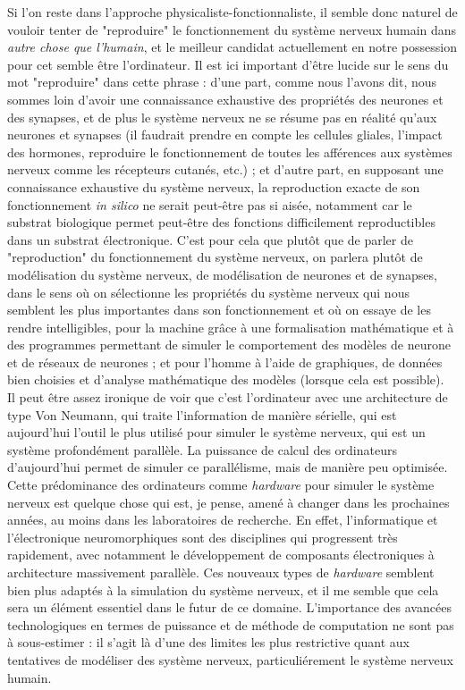 \documentclass[12pt]{scrartcl}
\begin{document}
Si l'on reste dans l'approche physicaliste-fonctionnaliste, il semble donc naturel de vouloir tenter de "reproduire" le fonctionnement du système nerveux humain dans \textit{autre chose que l'humain}, et le meilleur candidat actuellement en notre possession pour cet  semble être l'ordinateur. Il est ici important d'être lucide sur le sens du mot "reproduire" dans cette phrase : d'une part, comme nous l'avons dit, nous sommes loin d'avoir une connaissance exhaustive des propriétés des neurones et des synapses, et de plus le système nerveux ne se résume pas en réalité qu'aux neurones et synapses (il faudrait prendre en compte les cellules gliales, l'impact des hormones, reproduire le fonctionnement de toutes les afférences aux systèmes nerveux comme les récepteurs cutanés, etc.) ; et d'autre part, en supposant une connaissance exhaustive du système nerveux, la reproduction exacte de son fonctionnement \textit{in silico} ne serait peut-être pas si aisée, notamment car le substrat biologique permet peut-être des fonctions difficilement reproductibles dans un substrat électronique. C'est pour cela que plutôt que de parler de "reproduction" du fonctionnement du système nerveux, on parlera plutôt de modélisation du système nerveux, de modélisation de neurones et de synapses, dans le sens où on sélectionne les propriétés du système nerveux qui nous semblent les plus importantes dans son fonctionnement et où on essaye de les rendre intelligibles, pour la machine grâce à une formalisation mathématique et à des programmes permettant de simuler le comportement des modèles de neurone et de réseaux de neurones ; et pour l'homme à l'aide de graphiques, de données bien choisies et d'analyse mathématique des modèles (lorsque cela est possible).\\

Il peut être assez ironique de voir que c'est l'ordinateur avec une architecture de type Von Neumann, qui traite l'information de manière sérielle, qui est aujourd'hui l'outil le plus utilisé pour simuler le système nerveux, qui est un système profondément parallèle. La puissance de calcul des ordinateurs d'aujourd'hui permet de simuler ce parallélisme, mais de manière peu optimisée. Cette prédominance des ordinateurs comme \textit{hardware} pour simuler le système nerveux est quelque chose qui est, je pense, amené à changer dans les prochaines années, au moins dans les laboratoires de recherche. En effet, l'informatique et l'électronique neuromorphiques sont des disciplines qui progressent très rapidement, avec notamment le développement de composants électroniques à architecture massivement parallèle. Ces nouveaux types de \textit{hardware} semblent bien plus adaptés à la simulation du système nerveux, et il me semble que cela sera un élément essentiel dans le futur de ce domaine. L'importance des avancées technologiques en termes de puissance et de méthode de computation ne sont pas à sous-estimer : il s'agit là d'une des limites les plus restrictive quant aux tentatives de modéliser des système nerveux, particuliérement le système nerveux humain. \\
\end{document}
